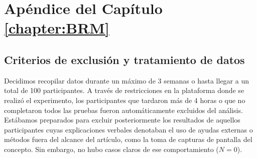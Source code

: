 
\chapter{Apéndice del Capítulo \ref{chapter:BRM}}

\section{Criterios de exclusión y tratamiento de datos}\label{Sec:ExclusionCriteria}

Decidimos recopilar datos durante un máximo de 3 semanas o hasta llegar a un total de 100 participantes. A través de restricciones en la plataforma donde se realizó el experimento, los participantes que tardaron más de 4 horas o que no completaron todos las pruebas fueron automáticamente excluidos del análisis. Estábamos preparados para excluir posteriormente los resultados de aquellos participantes cuyas explicaciones verbales denotaban el uso de ayudas externas o métodos fuera del alcance del artículo, como la toma de capturas de pantalla del concepto. Sin embargo, no hubo casos claros de ese comportamiento ($ N = 0 $).

